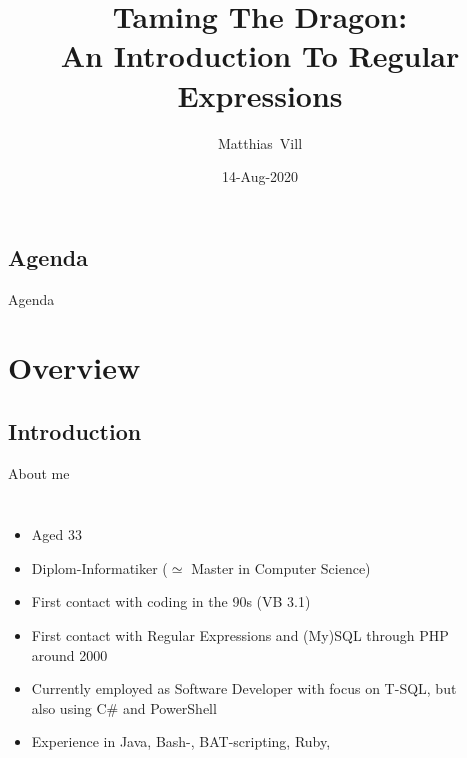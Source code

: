 \documentclass[english,aspectratio=169]{beamer}
\title[Introduction To Regular Expressions]{Taming The Dragon:\\
An Introduction To Regular Expressions}
\author[M. Vill]{Matthias~Vill}
\institute[NSD 2020]{New Stars of Data 2020}
\date{14-Aug-2020}
\begin{document}
\frame{\maketitle}


\subsection*{Agenda}
\begin{frame}{Agenda}
    \tableofcontents[hideallsubsections]
\end{frame}

\section{Overview}

\subsection{Introduction}
\begin{frame}{About me}
\begin{columns}
        \begin{itemize}
            \item Aged 33
            \item Diplom-Informatiker ($\simeq$ Master in Computer Science)
            \item First contact with coding in the 90s (VB 3.1)
            \item First contact with Regular Expressions and (My)SQL through PHP around 2000
            \item Currently employed as Software Developer with focus on T-SQL, but also using C\# and PowerShell
            \item Experience in Java, Bash-, BAT-scripting, Ruby, \textellipsis
        \end{itemize}
        \begin{center}
            \hyperlink{https://www.youracclaim.com/badges/bd81bbb0-8416-40b7-bede-77e7f2b0d5cf}{ }
        \end{center}
        \begin{center}
        \end{center}
    \end{columns}
\end{frame}
\end{document}

